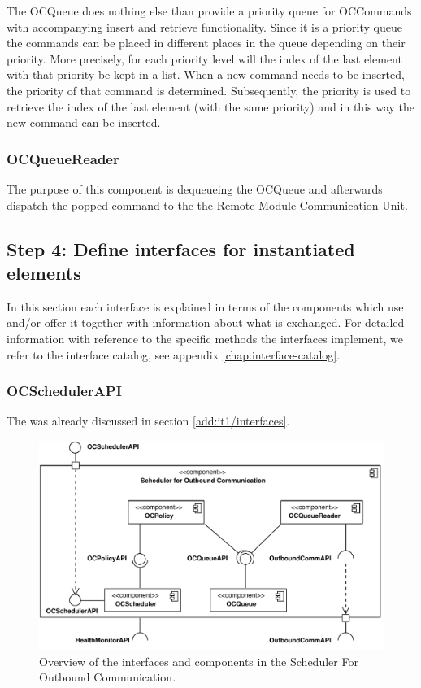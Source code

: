 \npar The OCQueue does nothing else than provide a priority queue for
OCCommands with accompanying insert and retrieve functionality. Since
it is a priority queue the commands can be placed in different places in the
queue depending on their priority. More precisely, for each priority level will
the index of the last element with that priority be kept in a list. When a new
command needs to be inserted, the priority of that command is determined.
Subsequently, the priority is used to retrieve the index of the last element
(with the same priority) and in this way the new command can be inserted.

\subsubsection{OCQueueReader}

\npar The purpose of this component is dequeueing the OCQueue and
afterwards dispatch the popped command to the the Remote Module Communication
Unit.

\subsection{Step 4: Define interfaces for instantiated elements}
\label{add:it7/interfaces}

\npar In this section each interface is explained in terms of the components
which use and/or offer it together with information about what is exchanged. For
detailed information with reference to the specific methods the interfaces
implement, we refer to the interface catalog, see appendix
\ref{chap:interface-catalog}.

\subsubsection{OCSchedulerAPI}

\npar The  was already discussed in section
\ref{add:it1/interfaces}.

\begin{figure}[H]
	\begin{centering}
		\includegraphics[width=\textwidth]{figs/add-it7-interfaces.pdf}
		\caption{Overview of the interfaces and components in the Scheduler For
		Outbound Communication.}
		\label{fig:it7/interfaces}
	\end{centering}
\end{figure}

